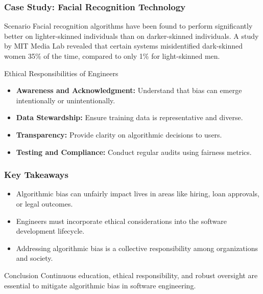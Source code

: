 \documentclass{beamer}
\begin{document}
\begin{frame}[fragile]
    \frametitle{Case Study: Facial Recognition Technology}

    \begin{block}{Scenario}
        Facial recognition algorithms have been found to perform significantly better on lighter-skinned individuals than on darker-skinned individuals. 
        A study by MIT Media Lab revealed that certain systems misidentified dark-skinned women 35\% of the time, compared to only 1\% for light-skinned men.
    \end{block}

    \begin{block}{Ethical Responsibilities of Engineers}
        \begin{itemize}
            \item \textbf{Awareness and Acknowledgment:} Understand that bias can emerge intentionally or unintentionally.
            \item \textbf{Data Stewardship:} Ensure training data is representative and diverse.
            \item \textbf{Transparency:} Provide clarity on algorithmic decisions to users.
            \item \textbf{Testing and Compliance:} Conduct regular audits using fairness metrics.
        \end{itemize}
    \end{block}
\end{frame}

\begin{frame}[fragile]
    \frametitle{Key Takeaways}

    \begin{itemize}
        \item Algorithmic bias can unfairly impact lives in areas like hiring, loan approvals, or legal outcomes.
        \item Engineers must incorporate ethical considerations into the software development lifecycle.
        \item Addressing algorithmic bias is a collective responsibility among organizations and society.
    \end{itemize}

    \begin{block}{Conclusion}
        Continuous education, ethical responsibility, and robust oversight are essential to mitigate algorithmic bias in software engineering.
    \end{block}
\end{frame}
\end{document}
